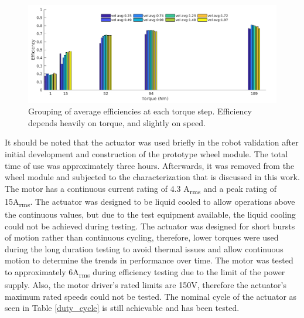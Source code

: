 \begin{figure}[t]
	\centering
	\includegraphics[width=0.8\linewidth]{images/eff_test_bar_plot_v3}
	\caption{Grouping of average efficiencies at each torque step.
		Efficiency depends heavily on torque, and slightly on speed.}
	\label{eff_results}
\end{figure}

It should be noted that the actuator was used briefly in the robot validation after initial development and construction of the prototype wheel module.
The total time of use was approximately three hours.
Afterwards, it was removed from the wheel module and subjected to the characterization that is discussed in this work.
The motor has a continuous current rating of 4.3 A\textsubscript{rms} and a peak rating of 15A\textsubscript{rms}.
The actuator was designed to be liquid cooled to allow operations above the continuous values, but due to the test equipment available, the liquid cooling could not be achieved during testing.
The actuator was designed for short bursts of motion rather than continuous cycling, therefore, lower torques were used during the long duration testing to avoid thermal issues and allow continuous motion to determine the trends in performance over time.
The motor was tested to approximately 6A\textsubscript{rms} during efficiency testing due to the limit of the power supply.
Also, the motor driver's rated limits are 150V, therefore the actuator's maximum rated speeds could not be tested.
The nominal cycle of the actuator as seen in Table \ref{duty_cycle} is still achievable and has been tested.


